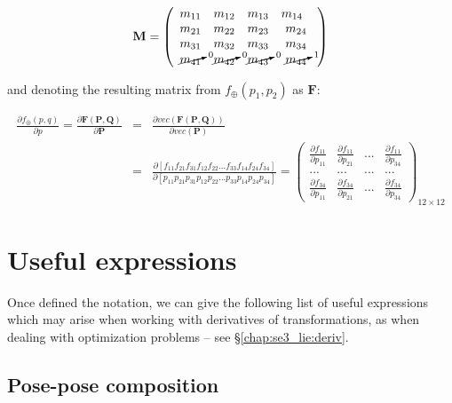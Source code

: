 \documentclass[a4paper,11pt]{report}
\begin{document}
\begin{equation}
\label{eq:deriv_sample2b}
\mathbf{M} =
\left(
\begin{array}{cccc}
 m_{11} & m_{12} & m_{13} & m_{14} ~~  \\
 m_{21} & m_{22} & m_{23} & m_{24}  \\
 m_{31} & m_{32} & m_{33} & m_{34}  \\
 \cancelto{0}{m_{41}} & \cancelto{0}{m_{42}} & \cancelto{0}{m_{43}} & \cancelto{1}{m_{44}}
\end{array}
\right)
\end{equation}

\noindent and denoting the resulting matrix from $f_\oplus(p_1,p_2)$ as $\mathbf{F}$:

\begin{eqnarray}
\label{eq:deriv_sample3}
\frac{\partial f_\oplus(p,q)}{\partial p} =
\frac{\partial \mathbf{F} (\mathbf{P},\mathbf{Q})}{\partial \mathbf{P}}
&=&
\frac{\partial vec( \mathbf{F} (\mathbf{P},\mathbf{Q})) }{\partial vec(\mathbf{P}) }
\\
&=&
\frac{\partial [
f_{11} f_{21} f_{31}
f_{12} f_{22} ...
f_{33} f_{14} f_{24} f_{34}] }
{\partial [
p_{11} p_{21} p_{31}
p_{12} p_{22} ...
p_{33} p_{14} p_{24} p_{34}] }
=
\left(
\begin{array}{cccc}
 \frac{\partial f_{11}}{\partial  p_{11} } &  \frac{\partial f_{11}}{\partial  p_{21} } & ...  & \frac{\partial f_{11}}{\partial  p_{34} } \\
  ... & ... & ... & ... \\
 \frac{\partial f_{34}}{\partial  p_{11} } &  \frac{\partial f_{34}}{\partial  p_{21} } & ...  & \frac{\partial f_{34}}{\partial  p_{34} }
\end{array}
\right)_{12 \times 12}
\end{eqnarray}



\section{Useful expressions}
\label{sect:mat_deriv:exp}

Once defined the notation, we can give the following list of
useful expressions which may arise when working with derivatives of transformations,
as when dealing with optimization problems -- see \S\ref{chap:se3_lie:deriv}.


\subsection{Pose-pose composition}
\label{sect:jacob_pose_pose_comp}
\end{document}
